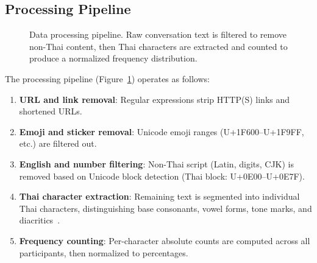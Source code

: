 \documentclass[10pt,twocolumn,a4paper]{article}
\begin{document}
\subsection{Processing Pipeline}
\label{sec:data_pipeline}

\begin{figure}[t]
\centering
{}
\caption{Data processing pipeline. Raw conversation text is filtered to remove non-Thai content, then Thai characters are extracted and counted to produce a normalized frequency distribution.}
\label{fig:pipeline}
\end{figure}

The processing pipeline (Figure~\ref{fig:pipeline}) operates as follows:

\begin{enumerate}
  \item \textbf{URL and link removal}: Regular expressions strip HTTP(S) links and shortened URLs.
  \item \textbf{Emoji and sticker removal}: Unicode emoji ranges (U+1F600--U+1F9FF, etc.) are filtered out.
  \item \textbf{English and number filtering}: Non-Thai script (Latin, digits, CJK) is removed based on Unicode block detection (Thai block: U+0E00--U+0E7F).
  \item \textbf{Thai character extraction}: Remaining text is segmented into individual Thai characters, distinguishing base consonants, vowel forms, tone marks, and diacritics~\cite{theeramunkong2001}.
  \item \textbf{Frequency counting}: Per-character absolute counts are computed across all participants, then normalized to percentages.
\end{enumerate}
\end{document}
